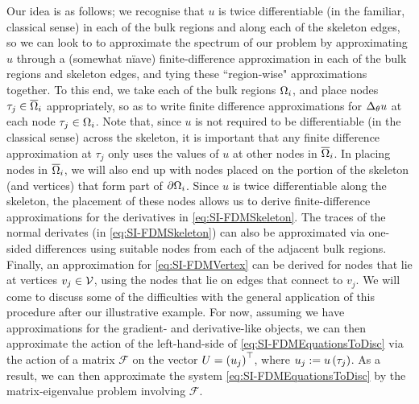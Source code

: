 Our idea is as follows; we recognise that $u$ is twice differentiable (in the familiar, classical sense) in each of the bulk regions and along each of the skeleton edges, so we can look to to approximate the spectrum of our problem by approximating $u$ through a (somewhat n{\"i}ave) finite-difference approximation in each of the bulk regions and skeleton edges, and tying these ``region-wise" approximations together.
To this end, we take each of the bulk regions $\Omega_i$, and place nodes $\tau_j\in\overline{\Omega}_{i}$ appropriately, so as to write finite difference approximations for $\Delta_{\theta}u$ at each node $\tau_j\in\Omega_i$.
Note that, since $u$ is not required to be differentiable (in the classical sense) across the skeleton, it is important that any finite difference approximation at $\tau_j$ only uses the values of $u$ at other nodes in $\overline{\Omega}_{i}$.
In placing nodes in $\overline{\Omega}_{i}$, we will also end up with nodes placed on the portion of the skeleton (and vertices) that form part of $\partial\Omega_i$.
Since $u$ is twice differentiable along the skeleton, the placement of these nodes allows us to derive finite-difference approximations for the derivatives in \eqref{eq:SI-FDMSkeleton}.
The traces of the normal derivates (in \eqref{eq:SI-FDMSkeleton}) can also be approximated via one-sided differences using suitable nodes from each of the adjacent bulk regions.
Finally, an approximation for \eqref{eq:SI-FDMVertex} can be derived for nodes that lie at vertices $v_j\in\mathcal{V}$, using the nodes that lie on edges that connect to $v_j$.
We will come to discuss some of the difficulties with the general application of this procedure after our illustrative example.
For now, assuming we have approximations for the gradient- and derivative-like objects, we can then approximate the action of the left-hand-side of \eqref{eq:SI-FDMEquationsToDisc} via the action of a matrix $\mathcal{F}$ on the vector $U = \left( u_j \right)^\top$, where $u_j:=u\left( \tau_j \right)$.
As a result, we can then approximate the system \eqref{eq:SI-FDMEquationsToDisc} by the matrix-eigenvalue problem involving $\mathcal{F}$.

